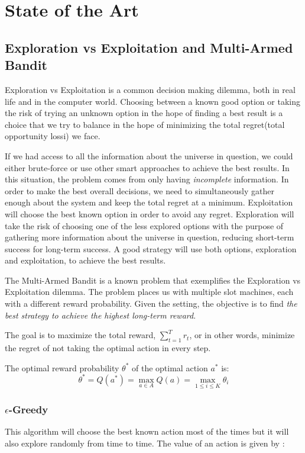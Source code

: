 \section{State of the Art}

\subsection{Exploration vs Exploitation and Multi-Armed Bandit} \label{sec:sota_mab}
Exploration vs Exploitation is a common decision making dilemma, both in real life
and in the computer world. Choosing between a known good option or taking the risk
of trying an unknown option in the hope of finding a best result is a choice that
we try to balance in the hope of minimizing the total regret(total opportunity
lossi\cite{kn:Silver}) we face.

If we had access to all the information about the universe in question, we could
either brute-force or use other smart approaches to achieve the best results. In
this situation, the problem comes from only having \textit{incomplete}
information. In order to make the best overall decisions, we need to
simultaneously gather enough about the system and keep the total regret at a
minimum. Exploitation will choose the best known option in order to avoid any
regret. Exploration will take the risk of choosing one of the less explored
options with the purpose of gathering more information about the universe in
question, reducing short-term success for long-term success. A good strategy will
use both options, exploration and exploitation, to achieve the best results.

The Multi-Armed Bandit is a known problem that exemplifies the Exploration vs
Exploitation dilemma. The problem places us with multiple slot machines, each with
a different reward probability. Given the setting, the objective is to find
\textit{the best strategy to achieve the highest long-term reward}\cite{kn:Weng2018}.


The goal is to maximize the total reward, $\sum^T_{t=1}r_t$, or in other words,
minimize the regret of not taking the optimal action in every step.

The optimal reward probability $\theta^*$ of the optimal action $a^*$ is:
\begin{displaymath}
    \theta^* = Q(a^*) = \max_{a \in A}  Q(a) = \max_{1 \leq i \leq K} \theta_i
\end{displaymath}


\subsubsection{$\epsilon$-Greedy}
This algorithm will choose the best known action most of the times but it will
also explore randomly from time to time. The value of an action is given by \cite{kn:Weng2018}:

